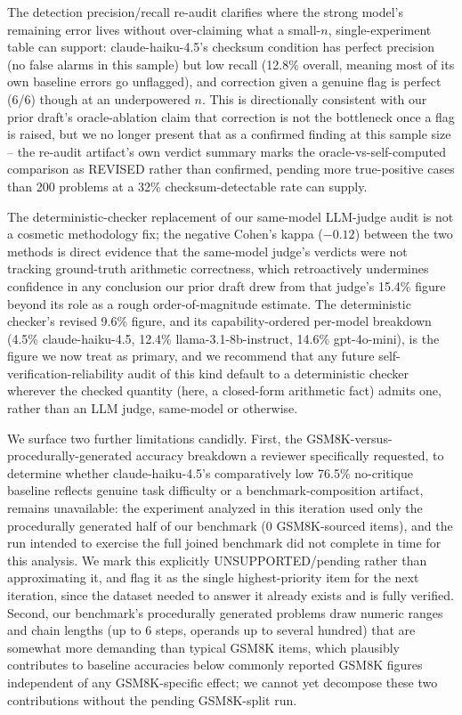 \documentclass[11pt,letterpaper]{article}
\begin{document}
The detection precision/recall re-audit clarifies where the strong model's remaining error lives without over-claiming what a small-$n$, single-experiment table can support: claude-haiku-4.5's checksum condition has perfect precision (no false alarms in this sample) but low recall (12.8\% overall, meaning most of its own baseline errors go unflagged), and correction given a genuine flag is perfect (6/6) though at an underpowered $n$. This is directionally consistent with our prior draft's oracle-ablation claim that correction is not the bottleneck once a flag is raised, but we no longer present that as a confirmed finding at this sample size -- the re-audit artifact's own verdict summary marks the oracle-vs-self-computed comparison as REVISED rather than confirmed, pending more true-positive cases than 200 problems at a 32\% checksum-detectable rate can supply.

The deterministic-checker replacement of our same-model LLM-judge audit is not a cosmetic methodology fix; the negative Cohen's kappa ($-0.12$) between the two methods is direct evidence that the same-model judge's verdicts were not tracking ground-truth arithmetic correctness, which retroactively undermines confidence in any conclusion our prior draft drew from that judge's 15.4\% figure beyond its role as a rough order-of-magnitude estimate. The deterministic checker's revised 9.6\% figure, and its capability-ordered per-model breakdown (4.5\% claude-haiku-4.5, 12.4\% llama-3.1-8b-instruct, 14.6\% gpt-4o-mini), is the figure we now treat as primary, and we recommend that any future self-verification-reliability audit of this kind default to a deterministic checker wherever the checked quantity (here, a closed-form arithmetic fact) admits one, rather than an LLM judge, same-model or otherwise.

We surface two further limitations candidly. First, the GSM8K-versus-procedurally-generated accuracy breakdown a reviewer specifically requested, to determine whether claude-haiku-4.5's comparatively low 76.5\% no-critique baseline reflects genuine task difficulty or a benchmark-composition artifact, remains unavailable: the experiment analyzed in this iteration used only the procedurally generated half of our benchmark (0 GSM8K-sourced items), and the run intended to exercise the full joined benchmark did not complete in time for this analysis. We mark this explicitly UNSUPPORTED/pending rather than approximating it, and flag it as the single highest-priority item for the next iteration, since the dataset needed to answer it already exists and is fully verified. Second, our benchmark's procedurally generated problems draw numeric ranges and chain lengths (up to 6 steps, operands up to several hundred) that are somewhat more demanding than typical GSM8K items, which plausibly contributes to baseline accuracies below commonly reported GSM8K figures independent of any GSM8K-specific effect; we cannot yet decompose these two contributions without the pending GSM8K-split run.
\end{document}
